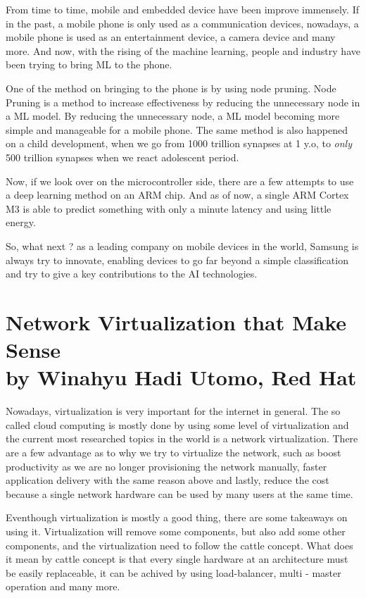 \documentclass[12pt, a4paper]{article}
\begin{document}
From time to time, mobile and embedded device have been improve immensely. If in the past, a mobile phone is only used as a communication devices, nowadays, a mobile phone is used as an entertainment device, a camera device and many more. And now, with the rising of the machine learning, people and industry have been trying to bring ML to the phone.

One of the method on bringing to the phone is by using node pruning. Node Pruning is a method to increase effectiveness by reducing the unnecessary node in a ML model. By reducing the unnecessary node, a ML model becoming more simple and manageable for a mobile phone. The same method is also happened on a child development, when we go from 1000 trillion synapses at 1 y.o, to \textit{only} 500 trillion synapses when we react adolescent period.

Now, if we look over on the microcontroller side, there are a few attempts to use a deep learning method on an ARM chip. And as of now, a single ARM Cortex M3 is able to predict something with only a minute latency and using little energy.

So, what next ? as a leading company on mobile devices in the world, Samsung is always try to innovate, enabling devices to go far beyond a simple classification and try to give a key contributions to the AI technologies.

\section*{Network Virtualization that Make Sense \\ by Winahyu Hadi Utomo, Red Hat}

Nowadays, virtualization is very important for the internet in general. The so called cloud computing is mostly done by using some level of virtualization and the current most researched topics in the world is a network virtualization. There are a few advantage as to why we try to virtualize the network, such as boost productivity as we are no longer provisioning the network manually, faster application delivery with the same reason above and lastly, reduce the cost because a single network hardware can be used by many users at the same time.

Eventhough virtualization is mostly a good thing, there are some takeaways on using it. Virtualization will remove some components, but also add some other components, and the virtualization need to follow the cattle concept. What does it mean by cattle concept is that every single hardware at an architecture must be easily replaceable, it can be achived by using load-balancer, multi - master operation and many more.
\end{document}
